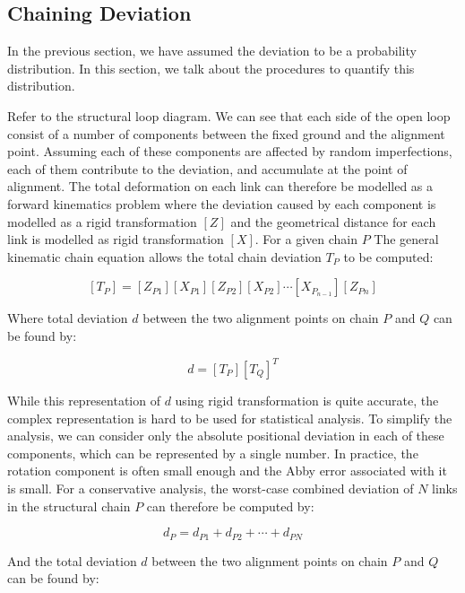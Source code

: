 \subsection{Chaining Deviation}

In the previous section, we have assumed the deviation to be a probability distribution. In this section, we talk about the procedures to quantify this distribution. 

Refer to the structural loop diagram. We can see that each side of the open loop consist of a number of components between the fixed ground and the alignment point. Assuming each of these components are affected by random imperfections, each of them contribute to the deviation, and accumulate at the point of alignment. The total deformation on each link can therefore be modelled as a forward kinematics problem where the deviation caused by each component is modelled as a rigid transformation $[Z]$ and the geometrical distance for each link is modelled as rigid transformation $[X]$. For a given chain $P$ The general kinematic chain equation allows the total chain deviation $T_P$ to be computed:

\begin{equation} \label{eq:one_chain_deviation}
    [T_P] = [Z_{P1}][X_{P1}][Z_{P2}][X_{P2}] \cdots [X_{P_{n-1}}][Z_{Pn}] 
\end{equation}

Where total deviation $d$ between the two alignment points on chain $P$ and $Q$ can be found by:

\begin{equation} \label{eq:two_chain_deviation}
    d = [T_P][T_Q]^T 
\end{equation}

While this representation of $d$ using rigid transformation is quite accurate, the complex representation is hard to be used for statistical analysis. To simplify the analysis, we can consider only the absolute positional deviation in each of these components, which can be represented by a single number. In practice, the rotation component is often small enough and the Abby error associated with it is small. For a conservative analysis, the worst-case combined deviation of $N$ links in the structural chain $P$ can therefore be computed by:

\begin{equation}
    d_P = d_{P1} + d_{P2} + \cdots + d_{PN}
\end{equation}

And the total deviation $d$ between the two alignment points on chain $P$ and $Q$ can be found by:

